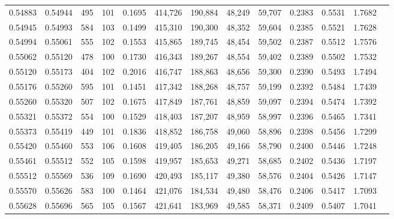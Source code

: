 \begin{tabular}{rrrrrrrrrrrrr}
0.54883 & 0.54944 &   495 & 101 &                                     0.1695 & 414,726 & 190,884 &  48,249 &  59,707 & 0.2383 & 0.5531 & 1.7682 \\
0.54945 & 0.54993 &   584 & 103 &                                     0.1499 & 415,310 & 190,300 &  48,352 &  59,604 & 0.2385 & 0.5521 & 1.7628 \\
0.54994 & 0.55061 &   555 & 102 &                                     0.1553 & 415,865 & 189,745 &  48,454 &  59,502 & 0.2387 & 0.5512 & 1.7576 \\
0.55062 & 0.55120 &   478 & 100 &                                     0.1730 & 416,343 & 189,267 &  48,554 &  59,402 & 0.2389 & 0.5502 & 1.7532 \\
0.55120 & 0.55173 &   404 & 102 &                                     0.2016 & 416,747 & 188,863 &  48,656 &  59,300 & 0.2390 & 0.5493 & 1.7494 \\
0.55176 & 0.55260 &   595 & 101 &                                     0.1451 & 417,342 & 188,268 &  48,757 &  59,199 & 0.2392 & 0.5484 & 1.7439 \\
0.55260 & 0.55320 &   507 & 102 &                                     0.1675 & 417,849 & 187,761 &  48,859 &  59,097 & 0.2394 & 0.5474 & 1.7392 \\
0.55321 & 0.55372 &   554 & 100 &                                     0.1529 & 418,403 & 187,207 &  48,959 &  58,997 & 0.2396 & 0.5465 & 1.7341 \\
0.55373 & 0.55419 &   449 & 101 &                                     0.1836 & 418,852 & 186,758 &  49,060 &  58,896 & 0.2398 & 0.5456 & 1.7299 \\
0.55420 & 0.55460 &   553 & 106 &                                     0.1608 & 419,405 & 186,205 &  49,166 &  58,790 & 0.2400 & 0.5446 & 1.7248 \\
0.55461 & 0.55512 &   552 & 105 &                                     0.1598 & 419,957 & 185,653 &  49,271 &  58,685 & 0.2402 & 0.5436 & 1.7197 \\
0.55512 & 0.55569 &   536 & 109 &                                     0.1690 & 420,493 & 185,117 &  49,380 &  58,576 & 0.2404 & 0.5426 & 1.7147 \\
0.55570 & 0.55626 &   583 & 100 &                                     0.1464 & 421,076 & 184,534 &  49,480 &  58,476 & 0.2406 & 0.5417 & 1.7093 \\
0.55628 & 0.55696 &   565 & 105 &                                     0.1567 & 421,641 & 183,969 &  49,585 &  58,371 & 0.2409 & 0.5407 & 1.7041 \\

\end{tabular}
